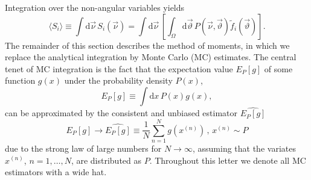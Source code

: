 \documentclass[aps,nofootinbib,preprintnumbers,prd,twocolumn]{revtex4-1}
\newcommand{\dual}[1]{\tilde{#1}}
\newcommand{\est}[1]{\widehat{#1}}
\newcommand{\nuvec}{\vec{\nu}}
\newcommand{\rmdx}[1]{\mbox{d} #1 \,} %
\newcommand{\thvec}{\vec{\vartheta}}
\renewcommand{\theta}{\vartheta}
\begin{document}
Integration over the non-angular variables yields
\begin{equation}
    \langle S_i\rangle
    \equiv \int \rmdx{\vec\nu} S_i(\nuvec)
    = \int \rmdx{\vec \nu} \left[\int_{\Omega} \rmdx{\vec \theta} P(\nuvec,\thvec) \dual{f}_i(\thvec) \right].
\end{equation}
The remainder of this section describes the method of moments, in
which we replace the analytical integration by Monte Carlo (MC)
estimates.  The central tenet of MC integration is the fact that the
expectation value $E_P[g]$ of some function $g(x)$ under the
probability density $P(x)$,
\begin{equation}
    E_P[g] \equiv \int \rmdx{x} P(x) g(x),
\end{equation}
can be approximated by the consistent and unbiased
estimator $\est{E_P[g]}$~\cite[sec. 8.2]{James:2006zz}
\begin{equation}
    \label{eq:mc-id}
    E_P[g] \to \widehat{E_P[g]} \equiv \frac{1}{N} \sum_{n=1}^N g(x^{(n)}) \,,\,    x^{(n)} \sim P
\end{equation}
due to the strong law of large numbers for $N \to \infty$, assuming
that the variates $x^{(n)}$, $n = 1, \dots, N$, are distributed as
$P$.
Throughout this letter we denote all MC estimators with a wide hat.\\
\end{document}
